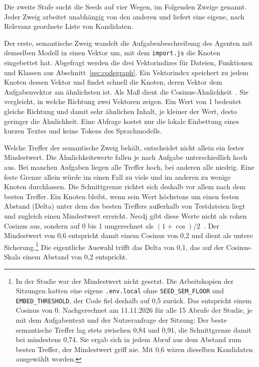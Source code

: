 Die zweite Stufe sucht die Seeds auf vier Wegen, im Folgenden Zweige genannt. Jeder Zweig arbeitet unabhängig von den anderen und liefert eine eigene, nach Relevanz geordnete Liste von Kandidaten.

Der erste, semantische Zweig wandelt die Aufgabenbeschreibung des Agenten mit demselben Modell in einen Vektor um, mit dem \texttt{import.js} die Knoten eingebettet hat. Abgefragt werden die drei Vektorindizes für Dateien, Funktionen und Klassen aus Abschnitt~\ref{sec:codegraph}. Ein Vektorindex speichert zu jedem Knoten dessen Vektor und findet schnell die Knoten, deren Vektor dem Aufgabenvektor am ähnlichsten ist. Als Maß dient die Cosinus-Ähnlichkeit~\parencite[Kap.~6]{manning2008ir}. Sie vergleicht, in welche Richtung zwei Vektoren zeigen. Ein Wert von 1 bedeutet gleiche Richtung und damit sehr ähnlichen Inhalt, je kleiner der Wert, desto geringer die Ähnlichkeit. Eine Abfrage kostet nur die lokale Einbettung eines kurzen Textes und keine Tokens des Sprachmodells.

Welche Treffer der semantische Zweig behält, entscheidet nicht allein ein fester Mindestwert. Die Ähnlichkeitswerte fallen je nach Aufgabe unterschiedlich hoch aus. Bei manchen Aufgaben liegen alle Treffer hoch, bei anderen alle niedrig. Eine feste Grenze allein würde im einen Fall zu viele und im anderen zu wenige Knoten durchlassen. Die Schnittgrenze richtet sich deshalb vor allem nach dem besten Treffer. Ein Knoten bleibt, wenn sein Wert höchstens um einen festen Abstand (Delta) unter dem des besten Treffers außerhalb von Testdateien liegt und zugleich einen Mindestwert erreicht. Neo4j gibt diese Werte nicht als rohen Cosinus aus, sondern auf 0 bis 1 umgerechnet als $(1 + \cos)/2$~\parencite{neo4jvector}. Der Mindestwert von 0,6 entspricht damit einem Cosinus von 0,2 und dient als untere Sicherung.\footnote{In der Studie war der Mindestwert nicht gesetzt. Die Arbeitskopien der Sitzungen hatten eine eigene \texttt{.env.local} ohne \texttt{SEED\_SEM\_FLOOR} und \texttt{EMBED\_THRESHOLD}, der Code fiel deshalb auf 0,5 zurück. Das entspricht einem Cosinus von 0. Nachgerechnet am 11.11.2026 für alle 15 Abrufe der Studie, je mit dem Aufgabentext und der Nutzeranfrage der Sitzung: Der beste semantische Treffer lag stets zwischen 0,84 und 0,91, die Schnittgrenze damit bei mindestens 0,74. Sie ergab sich in jedem Abruf aus dem Abstand zum besten Treffer, der Mindestwert griff nie. Mit 0,6 wären dieselben Kandidaten ausgewählt worden.} Die eigentliche Auswahl trifft das Delta von 0,1, das auf der Cosinus-Skala einem Abstand von 0,2 entspricht.

